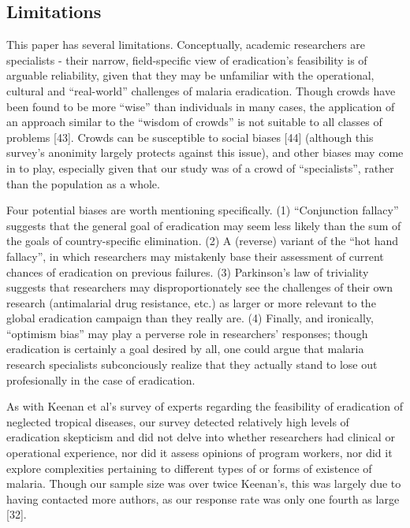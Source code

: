 \documentclass[]{article}
\begin{document}
\subsection{Limitations}\label{limitations}

This paper has several limitations. Conceptually, academic researchers
are specialists - their narrow, field-specific view of eradication's
feasibility is of arguable reliability, given that they may be
unfamiliar with the operational, cultural and ``real-world'' challenges
of malaria eradication. Though crowds have been found to be more
``wise'' than individuals in many cases, the application of an approach
similar to the ``wisdom of crowds'' is not suitable to all classes of
problems {[}43{]}. Crowds can be susceptible to social biases {[}44{]}
(although this survey's anonimity largely protects against this issue),
and other biases may come in to play, especially given that our study
was of a crowd of ``specialists'', rather than the population as a
whole.

Four potential biases are worth mentioning specifically. (1)
``Conjunction fallacy'' suggests that the general goal of eradication
may seem less likely than the sum of the goals of country-specific
elimination. (2) A (reverse) variant of the ``hot hand fallacy'', in
which researchers may mistakenly base their assessment of current
chances of eradication on previous failures. (3) Parkinson's law of
triviality suggests that researchers may disproportionately see the
challenges of their own research (antimalarial drug resistance, etc.) as
larger or more relevant to the global eradication campaign than they
really are. (4) Finally, and ironically, ``optimism bias'' may play a
perverse role in researchers' responses; though eradication is certainly
a goal desired by all, one could argue that malaria research specialists
subconciously realize that they actually stand to lose out profesionally
in the case of eradication.

As with Keenan et al's survey of experts regarding the feasibility of
eradication of neglected tropical diseases, our survey detected
relatively high levels of eradication skepticism and did not delve into
whether researchers had clinical or operational experience, nor did it
assess opinions of program workers, nor did it explore complexities
pertaining to different types of or forms of existence of malaria.
Though our sample size was over twice Keenan's, this was largely due to
having contacted more authors, as our response rate was only one fourth
as large {[}32{]}.
\end{document}
